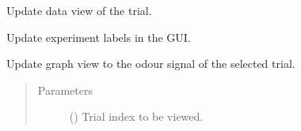 \documentclass[letterpaper,10pt,english]{sphinxmanual}
\begin{document}
\begin{fulllineitems}
\begin{fulllineitems}
\end{fulllineitems}


\begin{fulllineitems}
\label{\detokenize{NoSeMazeControl/main:main.MainApp.update_data_view}}
\pysigstartsignatures
{}
\pysigstopsignatures
\sphinxAtStartPar
Update data view of the trial.

\end{fulllineitems}


\begin{fulllineitems}
\label{\detokenize{NoSeMazeControl/main:main.MainApp.update_experiment_info}}
\pysigstartsignatures
{}
\pysigstopsignatures
\sphinxAtStartPar
Update experiment labels in the GUI.

\end{fulllineitems}


\begin{fulllineitems}
\label{\detokenize{NoSeMazeControl/main:main.MainApp.update_graphics_view}}
\pysigstartsignatures
{}
\pysigstopsignatures
\sphinxAtStartPar
Update graph view to the odour signal of the selected trial.
\begin{quote}\begin{description}
\item[{Parameters}] \leavevmode
\sphinxAtStartPar
{} () \textendash{} Trial index to be viewed.

\end{description}\end{quote}

\end{fulllineitems}



\end{fulllineitems}
\end{document}
